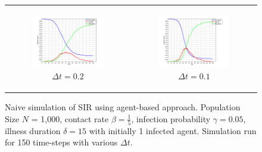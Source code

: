 \begin{figure}
\begin{center}
\begin{tabular}{c c}
    	\\
    	
		\begin{subfigure}[b]{0.3\textwidth}
			\centering
			\includegraphics[width=1\textwidth, angle=0]{./../shared/fig/frabs/SIR_1000agents_150t_02dt_NOSS_parallel.png}
			\caption{$\Delta t = 0.2$}
			\label{fig:sir_abs_approximating_02dt}
		\end{subfigure}
		& 
		\begin{subfigure}[b]{0.3\textwidth}
			\centering
			\includegraphics[width=1\textwidth, angle=0]{./../shared/fig/frabs/SIR_1000agents_150t_01dt_NOSS_parallel.png}
			\caption{$\Delta t = 0.1$}
			\label{fig:sir_abs_approximating_01dt}
		\end{subfigure}
	\end{tabular}
	
	\caption{Naive simulation of SIR using agent-based approach. Population Size $N$ = 1,000, contact rate $\beta = \frac{1}{5}$, infection probability $\gamma = 0.05$, illness duration $\delta = 15$ with initially 1 infected agent. Simulation run for 150 time-steps with various $\Delta t$.} 
	\label{fig:sir_abs_dynamics_naive}
\end{center}
\end{figure}

